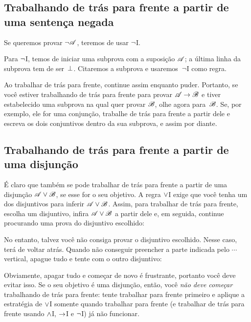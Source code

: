 \subsection*{Trabalhando de trás para frente a partir de uma sentença negada}

Se queremos provar $\neg \mathscr{A}$, teremos de usar $\neg$I.
\begin{fitchproof}
\open
{}
\ellipsesline 
{}
\close
{}
\end{fitchproof} 
Para $\neg$I, temos de iniciar uma subprova com a suposição $\mathscr{A}$; a última linha da subprova tem de ser~$\bot$. Citaremos a subprova e usaremos~$\neg$I como regra.

Ao trabalhar de trás para frente, continue assim enquanto puder. Portanto, se você estiver trabalhando de trás para frente para provar $\mathscr{A} \rightarrow \mathscr{B}$ e tiver estabelecido uma subprova na qual quer provar $\mathscr{B}$, olhe agora para~$\mathscr{B}$. Se, por exemplo, ele for uma conjunção, trabalhe de trás para frente a partir dele e escreva os dois conjuntivos dentro da sua subprova, e assim por diante.

\subsection*{Trabalhando de trás para frente a partir de uma disjunção}

É claro que também se pode trabalhar de trás para frente a partir de uma disjunção $\mathscr{A} \vee \mathscr{B}$, se esse for o seu objetivo.
A regra $\vee$I exige que você tenha um dos disjuntivos para inferir $\mathscr{A} \vee \mathscr{B}$.
Assim, para trabalhar de trás para frente, escolha um disjuntivo, infira $\mathscr{A} \vee \mathscr{B}$ a partir dele e, em seguida, continue procurando uma prova do disjuntivo escolhido:
\begin{fitchproof}
	\ellipsesline
\end{fitchproof}
No entanto, talvez você não consiga provar o disjuntivo escolhido. Nesse
caso, terá de voltar atrás. Quando não conseguir preencher a parte indicada
pelo $\cdots$ vertical,
apague tudo e tente com o outro disjuntivo:
\begin{fitchproof}
	\ellipsesline 
\end{fitchproof}
Obviamente, apagar tudo e começar de novo é frustrante, portanto você deve evitar isso. Se o seu objetivo é uma disjunção, então, você \emph{não deve começar} trabalhando de trás para frente: tente trabalhar para frente primeiro e aplique a estratégia de $\vee$I somente quando trabalhar para frente (e trabalhar de trás para frente usando $\wedge$I, $\rightarrow$I e $\neg$I) já não funcionar.

